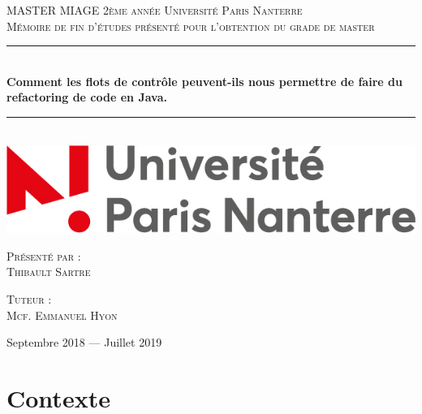 \documentclass[a4paper,twoside,12pt,openright]{report}
\newcommand{\HRule}{\rule{\linewidth}{0.5mm}}
\begin{document}
\begin{titlepage}
  \begin{sffamily}
  \begin{center}

    \textsc{\LARGE MASTER MIAGE 2ème année \linebreak Université Paris Nanterre}\\[2cm]

    \textsc{\Large Mémoire de fin d’études présenté pour l’obtention du grade de master}\\[1.5cm]

    \HRule \\[0.4cm]
    { \huge \bfseries Comment les flots de contrôle peuvent-ils nous permettre de faire du refactoring de code en Java. \\[0.4cm] }

    \HRule \\[2cm]
    \includegraphics[scale=0.40]{image/univ.jpg}
    \hspace{2cm}
    
    \vfill
  \begin{minipage}{0.4\textwidth}
      \begin{flushleft} \large
        \textsc{Présenté par :}\\ \textsc{Thibault Sartre}\\
      \end{flushleft}
    \end{minipage}
    \begin{minipage}{0.4\textwidth}
      \begin{flushright} \large
        \textsc{Tuteur :}\\ \textsc{Mcf. Emmanuel Hyon}\\
      \end{flushright}
    \end{minipage}
    \vfill
    {\large Septembre 2018 — Juillet 2019}
  \end{center}
  \end{sffamily}
\end{titlepage}
\renewcommand{\contentsname}{Sommaire}
\tableofcontents{}
\chapter{Contexte}
\end{document}

